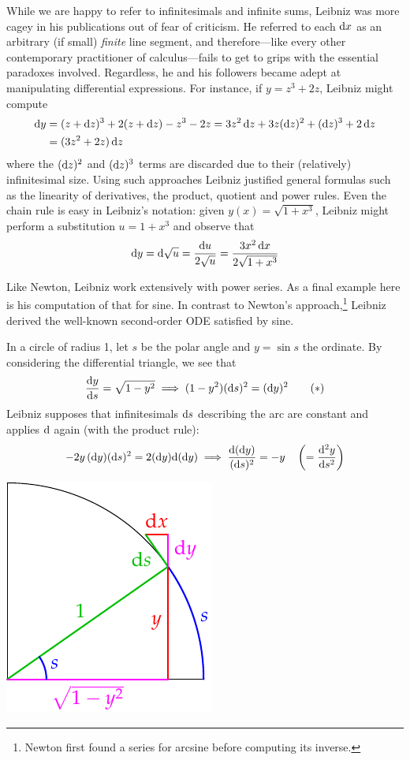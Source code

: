 \goodbreak
While we are happy to refer to infinitesimals and infinite sums, Leibniz was more cagey in his publications out of fear of criticism. He referred to each $\dx$ as an arbitrary (if small) \emph{finite} line segment, and therefore---like every other contemporary practitioner of calculus---fails to get to grips with the essential paradoxes involved. Regardless, he and his followers became adept at manipulating differential expressions. For instance, if $y=z^3+2z$, Leibniz might compute
\begin{align*}
	\dy&=(z+\dz)^3+2(z+\dz) -z^3-2z = 3z^2\,\dz+3z(\dz)^2 +(\dz)^3+2\,\dz\\
	&=(3z^2+2z)\,\dz
\end{align*}
where the $(\dz)^2$ and $(\dz)^3$ terms are discarded due to their (relatively) infinitesimal size. Using such approaches Leibniz justified general formulas such as the linearity of derivatives, the product, quotient and power rules. Even the chain rule is easy in Leibniz's notation: given $y(x)=\sqrt{1+x^3}$, Leibniz might perform a substitution $u=1+x^3$ and observe that
\[
	\dy=\D\sqrt u =\frac{\du}{2\sqrt u} =\frac{3x^2\,\dx}{2\sqrt{1+x^3}}
\]

Like Newton, Leibniz work extensively with power series. As a final example here is his computation of that for sine. In contrast to Newton's approach,\footnote{Newton first found a series for arcsine before computing its inverse.} Leibniz derived the well-known second-order ODE satisfied by sine.\par
\begin{minipage}[t]{0.7\linewidth}\vspace{-4pt}
In a circle of radius 1, let $s$ be the polar angle and $y=\sin s$ the ordinate. By considering the differential triangle, we see that
\[
	\frac{\dy}{\ds} =\sqrt{1-y^2} \implies (1-y^2)(\ds)^2=(\dy)^2 \tag{$\ast$}
\]
Leibniz supposes that infinitesimals $\ds$ describing the arc are constant and applies $\D$ again (with the product rule):\footnotemark
\[
	-2y\,(\dy)(\ds)^2=2(\dy)\D(\dy) \implies \frac{\D(\dy)}{(\ds)^2}=-y \quad \left(=\diff[^2y]{s^2}\right)
\]
\end{minipage}
\hfill
\begin{minipage}[t]{0.29\linewidth}\vspace{-8pt}
	\flushright\includegraphics{leibniz-sine}
\end{minipage}\medbreak


